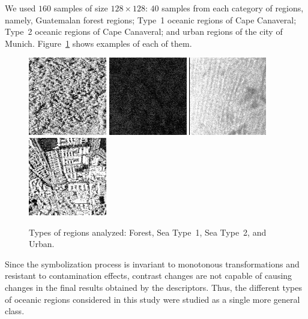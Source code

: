 \documentclass{isprs}
\begin{document}
We used $160$ samples of size $128\times128$: $40$ samples from each category of regions, namely,
Guatemalan forest regions; 
Type~1 oceanic regions of Cape Canaveral; 
Type~2 oceanic regions of Cape Canaveral; and 
urban regions of the city of Munich. 
Figure~\ref{fig:RegioesSAR} shows examples of each of them.

\begin{figure}[hbt]
	\centering
	\includegraphics[width=.23\linewidth]{Figures/guatemalaflorest}
	\includegraphics[width=.23\linewidth]{Figures/Cape1}
	\includegraphics[width=.23\linewidth]{Figures/Cape2}
	\includegraphics[width=.23\linewidth]{Figures/munichUrban}	
	\caption{Types of regions analyzed: Forest, Sea Type~1, Sea Type~2, and Urban.}\label{fig:RegioesSAR}
\end{figure} 

Since the symbolization process is invariant to monotonous transformations and resistant to contamination effects, contrast changes are not capable of causing changes in the final results obtained by the descriptors.
Thus, the different types of oceanic regions considered in this study were studied as a single more general class.
\end{document}
